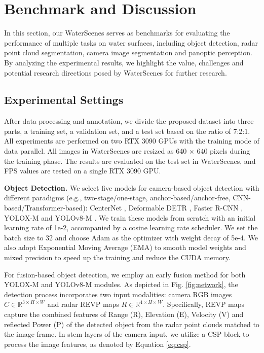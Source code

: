 \documentclass[lettersize,journal]{IEEEtran}
\begin{document}
\section{Benchmark and Discussion}
\label{sec:Benchmark}

In this section, our WaterScenes serves as benchmarks for evaluating the performance of multiple tasks on water surfaces, including object detection, radar point cloud segmentation, camera image segmentation and panoptic perception. By analyzing the experimental results, we highlight the value, challenges and potential research directions posed by WaterScenes for further research.

\subsection{Experimental Settings}

After data processing and annotation, we divide the proposed dataset into three parts, a training set, a validation set, and a test set based on the ratio of 7:2:1. All experiments are performed on two RTX 3090 GPUs with the training mode of data parallel. All images in WaterScenes are resized as 640 $\times$ 640 pixels during the training phase. The results are evaluated on the test set in WaterScenes, and FPS values are tested on a single RTX 3090 GPU.

\textbf{Object Detection.} We select five models for camera-based object detection with different paradigms (e.g., two-stage/one-stage, anchor-based/anchor-free, CNN-based/Transformer-based): CenterNet \cite{zhou2019objects}, Deformable DETR \cite{zhu2020deformable}, Faster R-CNN \cite{girshick2015fast},  YOLOX-M \cite{ge2021yolox} and YOLOv8-M \cite{yolov8}. We train these models from scratch with an initial learning rate of 1e-2, accompanied by a cosine learning rate scheduler. We set the batch size to 32 and choose Adam as the optimizer with weight decay of 5e-4. We also adopt Exponential Moving Average (EMA) to smooth model weights and mixed precision to speed up the training and reduce the CUDA memory.
 
For fusion-based object detection, we employ an early fusion method for both YOLOX-M and YOLOv8-M modules. As depicted in Fig. \ref{fig:network}, the detection process incorporates two input modalities: camera RGB images $C \in \mathbb{R}^{3\times H \times W}$ and radar REVP maps $R \in \mathbb{R}^{4\times H \times W}$. Specifically, REVP maps capture the combined features of Range (R), Elevation (E), Velocity (V) and reflected Power (P) of the detected object from the radar point clouds matched to the image frame. 
In stem layers of the camera input, we utilize a CSP block \cite{ge2021yolox} to process the image features, as denoted by Equation \ref{eq:csp}. 
\end{document}

